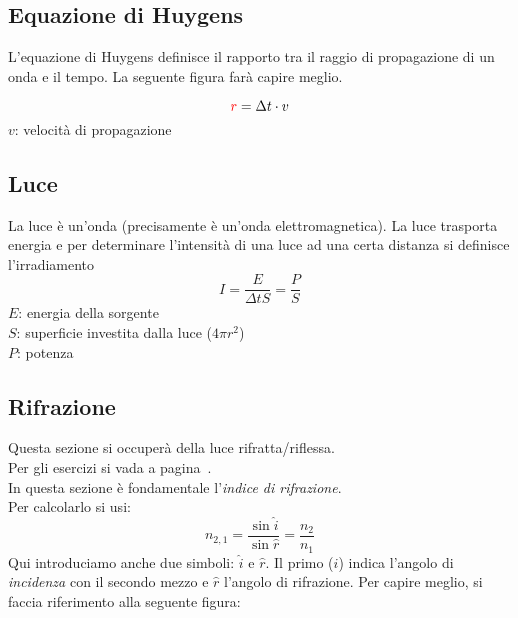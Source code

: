 \subsection{Equazione di Huygens}
L'equazione di Huygens definisce il rapporto tra il raggio di propagazione di un onda e il tempo.
La seguente figura farà capire meglio.

\begin{center}
\end{center}
\begin{equation*}
  \mathcolor{red}{r} = \Delta t\cdot v
\end{equation*}
$v$: velocità di propagazione

\subsection{Luce}
La luce è un'onda (precisamente è un'onda elettromagnetica). La luce trasporta energia e per 
determinare l'intensità di una luce ad una certa distanza si definisce l'irradiamento
\begin{equation*}
  I = \frac{E}{\Delta tS} = \frac{P}{S}
\end{equation*}
$E$: energia della sorgente\\
$S$: superficie investita dalla luce ($4\pi r^2$)\\
$P$: potenza

\subsection{Rifrazione}\label{subsec:onde:rifrazione}
Questa sezione si occuperà della luce rifratta/riflessa.\\
Per gli esercizi si vada a pagina~\pageref{ex:rifrazione}.\\ [\baselineskip]
In questa sezione è fondamentale l'\emph{indice di rifrazione}.\\
Per calcolarlo si usi:
\begin{equation*}
  n_{2,1} = \frac{\sin\hat{i}}{\sin\hat{r}} = \frac{n_2}{n_1}
\end{equation*}
Qui introduciamo anche due simboli: $\hat{i}$ e $\hat{r}$. Il primo ($\hat{i}$) indica l'angolo di
\emph{incidenza} con il secondo mezzo e $\hat{r}$ l'angolo di rifrazione. Per capire meglio, si
faccia riferimento alla seguente figura:

